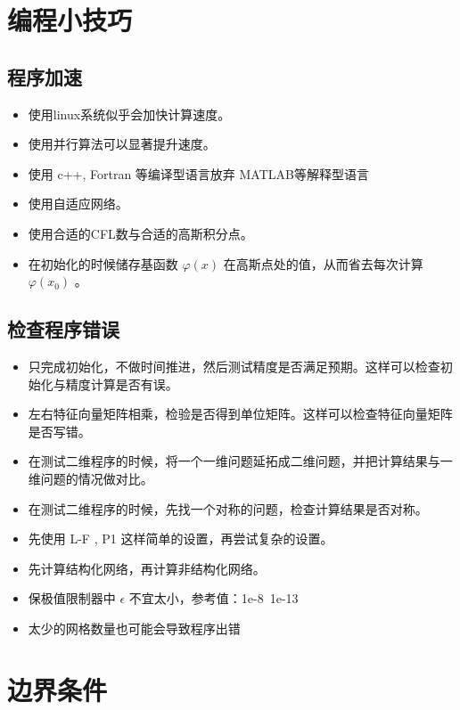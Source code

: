 \documentclass{book}
\begin{document}
\section{编程小技巧}
\subsection{程序加速}
\begin{itemize}
    \item 使用linux系统似乎会加快计算速度。
    \item 使用并行算法可以显著提升速度。
    \item 使用 c++, Fortran 等编译型语言放弃 MATLAB等解释型语言
    \item 使用自适应网络。
    \item 使用合适的CFL数与合适的高斯积分点。
    \item 在初始化的时候储存基函数 $\varphi(x)$ 在高斯点处的值，从而省去每次计算 $\varphi(x_0)$ 。
\end{itemize}
\subsection{检查程序错误}
\begin{itemize}
    \item 只完成初始化，不做时间推进，然后测试精度是否满足预期。这样可以检查初始化与精度计算是否有误。
    \item 左右特征向量矩阵相乘，检验是否得到单位矩阵。这样可以检查特征向量矩阵是否写错。
    \item 在测试二维程序的时候，将一个一维问题延拓成二维问题，并把计算结果与一维问题的情况做对比。
    \item 在测试二维程序的时候，先找一个对称的问题，检查计算结果是否对称。
    \item 先使用 L-F , P1 这样简单的设置，再尝试复杂的设置。
    \item 先计算结构化网络，再计算非结构化网络。
    \item 保极值限制器中 $\epsilon$ 不宜太小，参考值：1e-8~1e-13
    \item 太少的网格数量也可能会导致程序出错
\end{itemize}

\section{边界条件}
\end{document}
